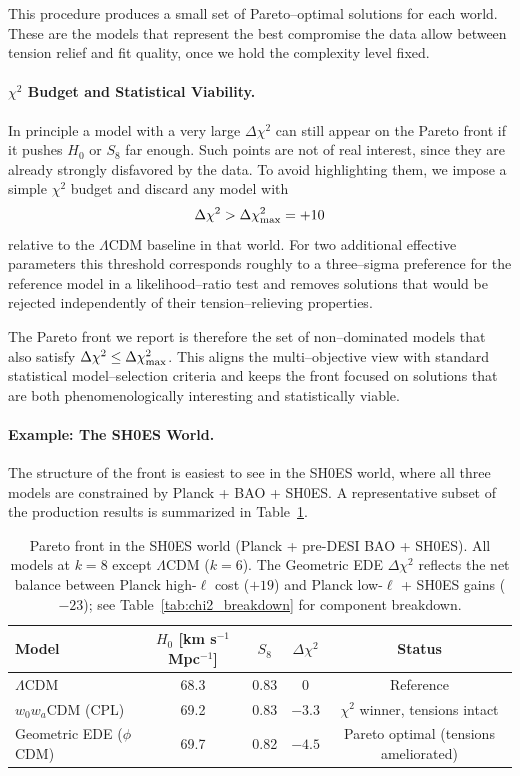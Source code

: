 \documentclass[a4paper,11pt]{article}
\begin{document}
This procedure produces a small set of Pareto--optimal solutions for each world. These are the models that represent the best compromise the data allow between tension relief and fit quality, once we hold the complexity level fixed.

\paragraph{$\chi^2$ Budget and Statistical Viability.}
In principle a model with a very large $\Delta\chi^2$ can still appear on the Pareto front if it pushes $H_0$ or $S_8$ far enough. Such points are not of real interest, since they are already strongly disfavored by the data. To avoid highlighting them, we impose a simple $\chi^2$ budget and discard any model with
\begin{equation}
\Delta\chi^2 > \Delta\chi^2_{\rm max} = +10
\end{equation}
relative to the $\Lambda$CDM baseline in that world. For two additional effective parameters this threshold corresponds roughly to a three--sigma preference for the reference model in a likelihood--ratio test and removes solutions that would be rejected independently of their tension--relieving properties.

The Pareto front we report is therefore the set of non--dominated models that also satisfy $\Delta\chi^2 \le \Delta\chi^2_{\rm max}$. This aligns the multi--objective view with standard statistical model--selection criteria and keeps the front focused on solutions that are both phenomenologically interesting and statistically viable.

\paragraph{Example: The SH0ES World.}
The structure of the front is easiest to see in the SH0ES world, where all three models are constrained by Planck + BAO + SH0ES. A representative subset of the production results is summarized in Table~\ref{tab:pareto_shoes}.

\begin{table}[h]
\centering
\caption{Pareto front in the SH0ES world (Planck + pre-DESI BAO + SH0ES). All models at $k = 8$ except $\Lambda$CDM ($k = 6$). The Geometric EDE $\Delta\chi^2$ reflects the net balance between Planck high-$\ell$ cost ($+19$) and Planck low-$\ell$ + SH0ES gains ($-23$); see Table~\ref{tab:chi2_breakdown} for component breakdown.}
\label{tab:pareto_shoes}
\begin{tabular}{lcccc}
\toprule
Model & $H_0$ [km s$^{-1}$ Mpc$^{-1}$] & $S_8$ & $\Delta\chi^2$ & Status \\
\midrule
$\Lambda$CDM & 68.3 & 0.83 & 0 & Reference \\
$w_0 w_a$CDM (CPL) & 69.2 & 0.83 & $-3.3$ & $\chi^2$ winner, tensions intact \\
Geometric EDE ($\phi$CDM) & 69.7 & 0.82 & $-4.5$ & Pareto optimal (tensions ameliorated) \\
\bottomrule
\end{tabular}
\end{table}
\end{document}
